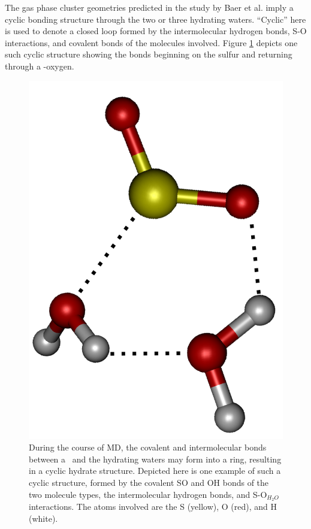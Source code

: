 \documentclass{article}
\begin{document}
The gas phase cluster geometries predicted in the study by Baer et al. imply a cyclic bonding structure through the two or three hydrating waters. ``Cyclic'' here is used to denote a closed loop formed by the intermolecular hydrogen bonds, S-O interactions, and covalent bonds of the molecules involved. Figure \ref{fig:cyclic-example} depicts one such cyclic structure showing the bonds beginning on the sulfur and returning through a \suldiox-oxygen.

\begin{figure}[h!]
	\begin{center}
		\includegraphics[scale=1.0]{double-cycle-type2-small.png}
		\caption{During the course of MD, the covalent and intermolecular bonds between a \suldiox~and the hydrating waters may form into a ring, resulting in a cyclic hydrate structure. Depicted here is one example of such a cyclic structure, formed by the covalent SO and OH bonds of the two molecule types, the intermolecular hydrogen bonds, and S-O$_{H_2O}$ interactions. The atoms involved are the S (yellow), O (red), and H (white).}
		\label{fig:cyclic-example}
	\end{center}
\end{figure}
\end{document}
